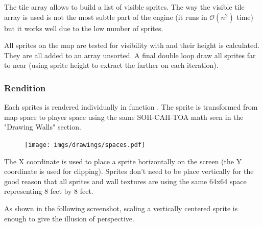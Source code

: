 The tile array allows to build a list of visible sprites. The way the visible tile array is used is not the most subtle part of the engine (it runs in $\mathcal{O}(n^2)$ time) but it works well due to the low number of sprites.\\
\par
 All sprites on the map are tested for visibility with  and their height is calculated. They are all added to an array unsorted. A final double loop draw all sprites far to near (using sprite height to extract the farther on each iteration).\\
\par
\begin{minipage}{\textwidth}
 
 \end{minipage}
 \par
 




\subsubsection{Rendition}
Each sprites is rendered individually in function . The sprite is transformed from map space to player space using the same SOH-CAH-TOA math seen in the "Drawing Walls" section.

\par
\begin{figure}[H]
\centering
 \texttt{[image: imgs/drawings/spaces.pdf]}
 \end{figure}
\par
The X coordinate is used to place a sprite horizontally on the screen (the Y coordinate is used for clipping). Sprites don't need to be place vertically for the good reason that all sprites and wall textures are using the same 64x64 space representing 8 feet by 8 feet.\\
\par
  \begin{minipage}{.5\textwidth}
  \end{minipage}
   \begin{minipage}{.5\textwidth} 
   \end{minipage}

\par



 As shown in the following screenshot, scaling a vertically centered sprite is enough to give the illusion of perspective.\\
\par
\begin{figure}[H]
 \centering
\end{figure}

